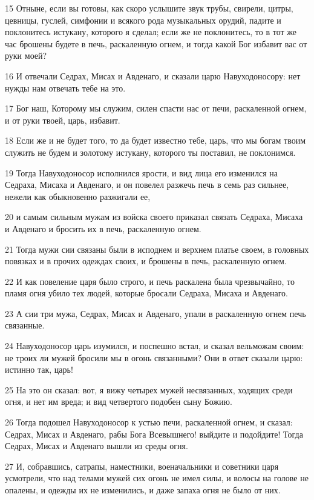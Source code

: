 \par 15 Отныне, если вы готовы, как скоро услышите звук трубы, свирели, цитры, цевницы, гуслей, симфонии и всякого рода музыкальных орудий, падите и поклонитесь истукану, которого я сделал; если же не поклонитесь, то в тот же час брошены будете в печь, раскаленную огнем, и тогда какой Бог избавит вас от руки моей?
\par 16 И отвечали Седрах, Мисах и Авденаго, и сказали царю Навуходоносору: нет нужды нам отвечать тебе на это.
\par 17 Бог наш, Которому мы служим, силен спасти нас от печи, раскаленной огнем, и от руки твоей, царь, избавит.
\par 18 Если же и не будет того, то да будет известно тебе, царь, что мы богам твоим служить не будем и золотому истукану, которого ты поставил, не поклонимся.
\par 19 Тогда Навуходоносор исполнился ярости, и вид лица его изменился на Седраха, Мисаха и Авденаго, и он повелел разжечь печь в семь раз сильнее, нежели как обыкновенно разжигали ее,
\par 20 и самым сильным мужам из войска своего приказал связать Седраха, Мисаха и Авденаго и бросить их в печь, раскаленную огнем.
\par 21 Тогда мужи сии связаны были в исподнем и верхнем платье своем, в головных повязках и в прочих одеждах своих, и брошены в печь, раскаленную огнем.
\par 22 И как повеление царя было строго, и печь раскалена была чрезвычайно, то пламя огня убило тех людей, которые бросали Седраха, Мисаха и Авденаго.
\par 23 А сии три мужа, Седрах, Мисах и Авденаго, упали в раскаленную огнем печь связанные.
\par 24 Навуходоносор царь изумился, и поспешно встал, и сказал вельможам своим: не троих ли мужей бросили мы в огонь связанными? Они в ответ сказали царю: истинно так, царь!
\par 25 На это он сказал: вот, я вижу четырех мужей несвязанных, ходящих среди огня, и нет им вреда; и вид четвертого подобен сыну Божию.
\par 26 Тогда подошел Навуходоносор к устью печи, раскаленной огнем, и сказал: Седрах, Мисах и Авденаго, рабы Бога Всевышнего! выйдите и подойдите! Тогда Седрах, Мисах и Авденаго вышли из среды огня.
\par 27 И, собравшись, сатрапы, наместники, военачальники и советники царя усмотрели, что над телами мужей сих огонь не имел силы, и волосы на голове не опалены, и одежды их не изменились, и даже запаха огня не было от них.
